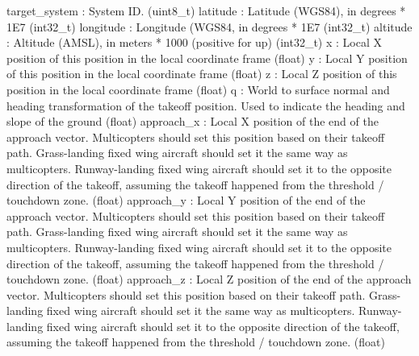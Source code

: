 \begin{DoxyVerb}
\begin{DoxyVerb}
\begin{DoxyVerb}
\begin{DoxyVerb}
\begin{DoxyVerb}
\begin{DoxyVerb}
\begin{DoxyVerb}
\begin{DoxyVerb}
\begin{DoxyVerb}
\begin{DoxyVerb}
\begin{DoxyVerb}
target_system             : System ID. (uint8_t)
latitude                  : Latitude (WGS84), in degrees * 1E7 (int32_t)
longitude                 : Longitude (WGS84, in degrees * 1E7 (int32_t)
altitude                  : Altitude (AMSL), in meters * 1000 (positive for up) (int32_t)
x                         : Local X position of this position in the local coordinate frame (float)
y                         : Local Y position of this position in the local coordinate frame (float)
z                         : Local Z position of this position in the local coordinate frame (float)
q                         : World to surface normal and heading transformation of the takeoff position. Used to indicate the heading and slope of the ground (float)
approach_x                : Local X position of the end of the approach vector. Multicopters should set this position based on their takeoff path. Grass-landing fixed wing aircraft should set it the same way as multicopters. Runway-landing fixed wing aircraft should set it to the opposite direction of the takeoff, assuming the takeoff happened from the threshold / touchdown zone. (float)
approach_y                : Local Y position of the end of the approach vector. Multicopters should set this position based on their takeoff path. Grass-landing fixed wing aircraft should set it the same way as multicopters. Runway-landing fixed wing aircraft should set it to the opposite direction of the takeoff, assuming the takeoff happened from the threshold / touchdown zone. (float)
approach_z                : Local Z position of the end of the approach vector. Multicopters should set this position based on their takeoff path. Grass-landing fixed wing aircraft should set it the same way as multicopters. Runway-landing fixed wing aircraft should set it to the opposite direction of the takeoff, assuming the takeoff happened from the threshold / touchdown zone. (float)\end{DoxyVerb}
 \mbox{\label{classpymavlink_1_1dialects_1_1v10_1_1MAVLink_a08f6254bd80120113550d4ebe5493eb7}} 

\end{DoxyVerb}
\end{DoxyVerb}
\end{DoxyVerb}
\end{DoxyVerb}
\end{DoxyVerb}
\end{DoxyVerb}
\end{DoxyVerb}
\end{DoxyVerb}
\end{DoxyVerb}
\end{DoxyVerb}
